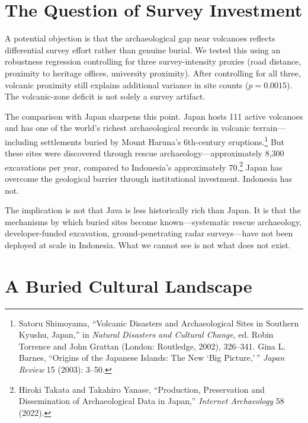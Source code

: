 \documentclass[12pt,a4paper]{article}
\begin{document}
\section{The Question of Survey Investment}

A potential objection is that the archaeological gap near volcanoes reflects differential survey effort rather than genuine burial. We tested this using an robustness regression controlling for three survey-intensity proxies (road distance, proximity to heritage offices, university proximity). After controlling for all three, volcanic proximity still explains additional variance in site counts ($p = 0.0015$). The volcanic-zone deficit is not solely a survey artifact.

The comparison with Japan sharpens this point. Japan hosts 111 active volcanoes and has one of the world's richest archaeological records in volcanic terrain---including settlements buried by Mount Haruna's 6th-century eruptions.\footnote{Satoru Shimoyama, ``Volcanic Disasters and Archaeological Sites in Southern Kyushu, Japan,'' in \emph{Natural Disasters and Cultural Change}, ed. Robin Torrence and John Grattan (London: Routledge, 2002), 326--341. Gina L. Barnes, ``Origins of the Japanese Islands: The New `Big Picture,'\,'' \emph{Japan Review} 15 (2003): 3--50.} But these sites were discovered through rescue archaeology---approximately 8,300 excavations per year, compared to Indonesia's approximately 70.\footnote{Hiroki Takata and Takahiro Yanase, ``Production, Preservation and Dissemination of Archaeological Data in Japan,'' \emph{Internet Archaeology} 58 (2022).} Japan has overcome the geological barrier through institutional investment. Indonesia has not.

The implication is not that Java is less historically rich than Japan. It is that the mechanisms by which buried sites become known---systematic rescue archaeology, developer-funded excavation, ground-penetrating radar surveys---have not been deployed at scale in Indonesia. What we cannot see is not what does not exist.

\section{A Buried Cultural Landscape}
\end{document}
